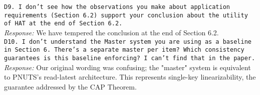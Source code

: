 \documentclass[10pt]{article}
\newcommand{\reviewer}[1] {\noindent\texttt{#1}\\}
\newcommand{\response}[1] {\noindent\textit{Response: } #1\\}
\begin{document}
\reviewer{D9. I don't see how the observations you make about application requirements 
(Section 6.2) support your conclusion about the utility of HAT at the end 
 of Section 6.2. }

\response{We have tempered the conclusion at the end of Section 6.2.}

\reviewer{D10. I don't understand the Master system you are using as a baseline in Section 6. There's a separate master per item? Which consistency guarantees is this baseline enforcing? I can't find that in the paper.}

\response{Our original wording was confusing; the "master" system is equivalent
to PNUTS's read-latest architecture. This represents single-key
linearizability, the guarantee addressed by the CAP Theorem.}
\end{document}
